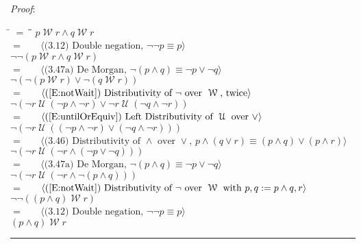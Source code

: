 \documentclass[12pt, fleqn, leqno]{article}
\newcommand{\lgap}{2pt}                             %
\newcommand{\mymathindent}{24pt}                    %
\newcommand{\Until}{\;\mathcal{U}\;}
\newcommand{\Wait}{\;\mathcal{W}\;}
\newcommand{\Always}{\Box\,}
\newcommand{\myqed}{\rule[-.23ex]{1.2ex}{2.0ex}}
\newcommand{\myqedtab}{\hspace{384pt}}              %
\newcommand{\Gll} {\langle}                         %
\newcommand{\Ggg} {\rangle}                         %
\newcommand{\Hint}[1]     {\ \ \ $\Gll              \mbox{#1} \Ggg$ }   %
\begin{document}
\emph{Proof}:
\begin{tabbing}
\hspace{\mymathindent} \= $= \;$ \= \myqedtab \= \kill
\> \>$p \Wait r \land q \Wait r$\\[\lgap]
\> $=$ \> \Hint{(3.12) Double negation, $\neg\neg p\equiv p$} \\[\lgap]
\> \>$\neg\neg(p \Wait r \land q \Wait r)$\\[\lgap]
\> $=$ \> \Hint{(3.47a) De Morgan, $\neg (p\land q)\equiv \neg p\lor \neg q$} \\[\lgap]
\> \>$\neg(\neg(p \Wait r) \lor \neg(q \Wait r))$\\[\lgap]
\> $=$ \> \Hint{(\ref{E:notWait}) Distributivity of $\neg$ over $\Wait$, twice} \\[\lgap]
\> \>$\neg(\neg r \Until (\neg p \land \neg r) \lor \neg r \Until (\neg q \land \neg r))$\\[\lgap]
\> $=$ \> \Hint{(\ref{E:untilOrEquiv}) Left Distributivity of $\Until$ over $\lor$} \\[\lgap]
\> \>$\neg(\neg r \Until ((\neg p \land \neg r)\lor (\neg q \land \neg r)))$\\[\lgap]
\> $=$  \>  \Hint{(3.46) Distributivity of $\land$ over $\lor$, $p\land (q\lor r)\equiv (p\land q)\lor (p\land r)$}\\[\lgap]
\> \>$\neg(\neg r \Until (\neg r\land(\neg p\lor \neg q)))$\\[\lgap]
\> $=$ \> \Hint{(3.47a) De Morgan, $\neg (p\land q)\equiv \neg p\lor \neg q$} \\[\lgap]
\> \>$\neg(\neg r \Until (\neg r\land\neg (p\land q)))$\\[\lgap]
\> $=$ \> \Hint{(\ref{E:notWait}) Distributivity of $\neg$ over $\Wait$ with $p,q:=p\land q,r$} \\[\lgap]
\> \>$\neg\neg((p\land q)\Wait r)$\\[\lgap]
\> $=$ \> \Hint{(3.12) Double negation, $\neg\neg p\equiv p$} \\[\lgap]
\> \>$(p\land q)\Wait r$ \quad \myqed
\end{tabbing}
\end{document}
